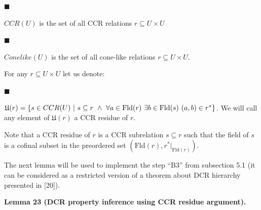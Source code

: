 \documentclass[10pt,a4paper]{amsart}
\begin{document}
\par\noindent  $\blacksquare$ 
 
$CCR(U)$ is the set of all CCR relations $r\subseteq U\times U$\par
 
 
 
\par\noindent  $\blacksquare$ 
 
$Conelike(U)$ is the set of all cone-like relations $r\subseteq U\times U$.\par
 
 
  
 
 
For any $r\subseteq U\times U$ let us denote:\par
  
\par\noindent  $\blacksquare$ 
 
$\mathfrak{U}(r)=\{s\in CCR(U)\leavevmode\nobreak\ |\leavevmode\nobreak\ s%
\subseteq r\leavevmode\nobreak\ \wedge\leavevmode\nobreak\ \forall a\in\mathrm%
{Fld}(r)\leavevmode\nobreak\ \exists b\in\mathrm{Fld}(s)\leavevmode\nobreak\ (%
a,b)\in r^{*}\}$. We will call any element of $\mathfrak{U}(r)$ a CCR residue of $r$.\par
 
 
  
 
 
Note that a CCR residue of $r$ is a CCR subrelation $s\subseteq r$ such that the field of $s$ is a cofinal subset in the preordered set $(\mathrm{Fld}(r),r^{*}|_{\mathrm{Fld}(r)})$.\par
 
 
 
The next lemma will be used to implement the step “B3” from subsection 5.1 (it can be considered as a restricted version of a theorem about DCR hierarchy presented in [20]).\par
 
 
 
\par\medskip\noindent\textbf{Lemma 23 (DCR property inference using CCR residue argument).}\par
 
\end{document}
